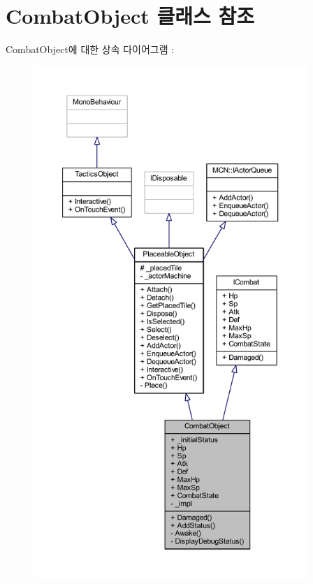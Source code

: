 \hypertarget{class_combat_object}{}\section{Combat\+Object 클래스 참조}
\label{class_combat_object}


Combat\+Object에 대한 상속 다이어그램 \+: 
\nopagebreak
\begin{figure}[H]
\begin{center}
\leavevmode
\includegraphics[height=550pt]{class_combat_object__inherit__graph}
\end{center}
\end{figure}


